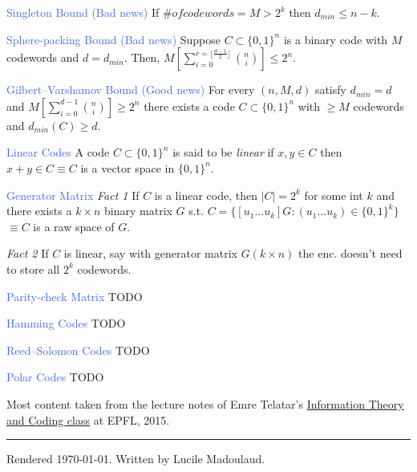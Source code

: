 \documentclass[10pt,a4paper,landscape]{article}
\newcommand{\concept}[1]{\textcolor{RoyalBlue}{#1}}
\newcommand{\subconcept}[1]{\textcolor{PineGreen}{\textit{#1}}}
\renewcommand{\section}[1]{
    \vspace{-0.3cm}
    \begin{center}
      \color{Bittersweet}
      \hrulefill{\small~~#1~~}\hrulefill
    \end{center}
    \vspace{-0.3cm}
  }
\begin{document}
\begin{multicols*}{4}
\concept{Singleton Bound (Bad news)}
If $\# of codewords = M > 2^k$ then $d_{min} \le n-k$.
 
\concept{Sphere-packing Bound (Bad news)}
Suppose $C \subset \{0,1\}^n$ is a binary code with $M$ codewords and $d=d_{min}$.
Then, $M \left[ \sum_{i=0}^{r=\lfloor \frac{d-1}{2} \rfloor} \binom{n}{i} \right] \le 2^n $.

\concept{Gilbert–Varshamov Bound (Good news)}
For every $(n,M,d)$ satisfy
$d_{min}=d$ and $M \left[ \sum_{i=0}^{d-1} \binom{n}{i} \right] \ge 2^n $
there exists a code $C \subset \{0,1\}^n$ with $\ge M$ codewords and $d_{min}(C) \ge d$.

\concept{Linear Codes}
A code $C \subset \{0,1\}^n$ is said to be \subconcept{linear} if $x,y \in C$ then $x+y \in C \equiv C$ is a vector space in $\{0,1\}^n$.
 
\concept{Generator Matrix}
\subconcept{Fact 1} If $C$ is a linear code, then $|C|=2^k$ for some int $k$ and there exists a $k\times n$ binary matrix $G$ s.t.
$C=\{[u_1...u_k] G:(u_1...u_k) \in \{0,1\}^k\}$
$\equiv C$ is a raw space of $G$.

\subconcept{Fact 2} If $C$ is linear, say with generator matrix 
$G(k \times n)$ the enc. doesn't need to store all $2^k$ codewords.
 
\concept{Parity-check Matrix} TODO
 
\concept{Hamming Codes} TODO

\concept{Reed–Solomon Codes} TODO

\concept{Polar Codes} TODO

\ifdefined \longversion %
\else \newpage
\fi



\section{Credits}
Most content taken from the lecture notes of Emre Telatar's \href{http://ipg.epfl.ch/doku.php?id=en:courses:2015-2016:itc}{Information Theory and Coding class} at EPFL, 2015.

\vspace{0.5cm}
\hrule
\vspace{0.5cm}
\tiny
Rendered \today. Written by Lucile Madoulaud.

\end{multicols*}
\end{document}
